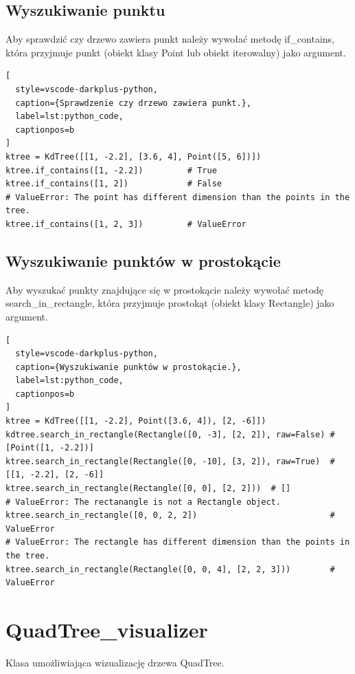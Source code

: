 \documentclass{lab}
\begin{document}
\subsection{Wyszukiwanie punktu}
Aby sprawdzić czy drzewo zawiera punkt należy wywołać metodę if\_contains, która przyjmuje punkt (obiekt klasy Point lub obiekt iterowalny) jako argument.
\begin{lstlisting}[
  style=vscode-darkplus-python,
  caption={Sprawdzenie czy drzewo zawiera punkt.},
  label=lst:python_code,
  captionpos=b
]
ktree = KdTree([[1, -2.2], [3.6, 4], Point([5, 6])])
ktree.if_contains([1, -2.2])         # True
ktree.if_contains([1, 2])            # False
# ValueError: The point has different dimension than the points in the tree.
ktree.if_contains([1, 2, 3])         # ValueError
\end{lstlisting}

\subsection{Wyszukiwanie punktów w prostokącie}
Aby wyszukać punkty znajdujące się w prostokącie należy wywołać metodę search\_in\_rectangle, która przyjmuje prostokąt (obiekt klasy Rectangle) jako argument.
\begin{lstlisting}[
  style=vscode-darkplus-python,
  caption={Wyszukiwanie punktów w prostokącie.},
  label=lst:python_code,
  captionpos=b
]
ktree = KdTree([[1, -2.2], Point([3.6, 4]), [2, -6]])
kdtree.search_in_rectangle(Rectangle([0, -3], [2, 2]), raw=False) # [Point([1, -2.2])]
ktree.search_in_rectangle(Rectangle([0, -10], [3, 2]), raw=True)  # [[1, -2.2], [2, -6]]
ktree.search_in_rectangle(Rectangle([0, 0], [2, 2]))  # []
# ValueError: The rectanangle is not a Rectangle object.
ktree.search_in_rectangle([0, 0, 2, 2])                           # ValueError
# ValueError: The rectangle has different dimension than the points in the tree.
ktree.search_in_rectangle(Rectangle([0, 0, 4], [2, 2, 3]))        # ValueError
\end{lstlisting}

\section{QuadTree\_visualizer}
Klasa umożliwiająca wizualizację drzewa QuadTree.
\end{document}
